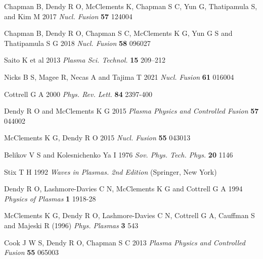 \documentclass[12pt]{iopart}
\begin{document}
\begin{thebibliography}{9}
Chapman B, Dendy R O, McClements K, Chapman S C, Yun G, Thatipamula S, and Kim M 2017 \textit{Nucl. Fusion} \textbf{57} 124004

Chapman B, Dendy R O, Chapman S C, McClements K G, Yun G S and Thatipamula S G 2018 \textit{Nucl. Fusion} \textbf{58} 096027

Saito K et al 2013 \textit{Plasma Sci. Technol.} \textbf{15} 209–212

Nicks B S, Magee R, Necas A and Tajima T 2021 \textit{Nucl. Fusion} \textbf{61} 016004

Cottrell G A 2000 \textit{Phys. Rev. Lett.} \textbf{84} 2397-400

Dendy R O and McClements K G 2015 \textit{Plasma Physics and Controlled Fusion} \textbf{57} 044002

McClements K G, Dendy R O 2015 \textit{Nucl. Fusion} \textbf{55} 043013

Belikov V S and Kolesnichenko Ya I 1976 \textit{Sov. Phys. Tech. Phys.} \textbf{20} 1146

Stix T H 1992 \textit{Waves in Plasmas. 2nd Edition} (Springer, New York)

Dendy R O, Lashmore-Davies C N, McClements K G and Cottrell G A 1994 \textit{Physics of Plasmas} \textbf{1} 1918-28

McClements K G, Dendy R O, Lashmore-Davies C N, Cottrell G A, Cauffman S and Majeski R (1996) \textit{Phys. Plasmas} \textbf{3} 543

Cook J W S, Dendy R O, Chapman S C 2013 \textit{Plasma Physics and Controlled Fusion} \textbf{55} 065003


\end{thebibliography}
\end{document}
